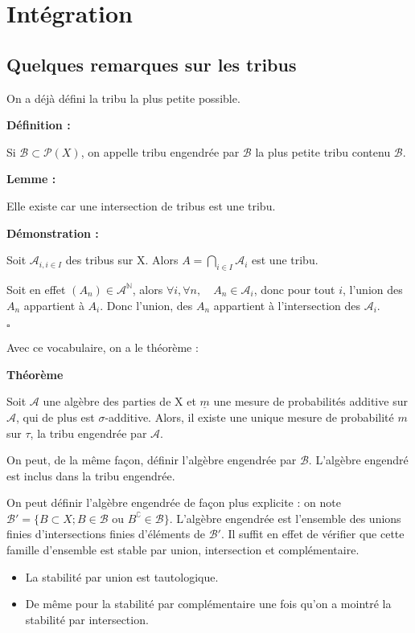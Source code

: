 \documentclass[10pt,a4paper,notitlepage ]{report}
\newcommand{\N}{\mathbb N}
\newcommand{\A}{\mathcal A}
\newcommand{\B}{\mathcal B}
\newcommand{\1}{\mathds 1}
\newcommand{\comp}[1]{#1^\complement}
\newenvironment{definition}[1][]{
	
	\textbf{Définition #1 : }
}
{}
\newcounter{th}
\newenvironment{theorem}[1][]{
\refstepcounter{th}
\begin{tcolorbox}
	\textbf{Théorème \theth \ #1}
	
	
}{\end{tcolorbox}}
\newenvironment{demo}[1][]{

	\textbf{Démonstration #1 :}
}{\begin{flushright}
	$\square$
\end{flushright}
}
\newenvironment{lemme}[1][]{
	\begin{tcolorbox}
		\textbf{Lemme #1 : }
	}
	{\end{tcolorbox}}
\begin{document}
\chapter{Intégration}

\section{Quelques remarques sur les tribus}

On a déjà défini la tribu la plus petite possible. 

\begin{definition}
Si $\mathcal{B} \subset \mathcal{P} (X)$, on appelle tribu engendrée par $\mathcal{B}$ la plus petite tribu contenu $\mathcal{B}$.
\end{definition}

\begin{lemme}
Elle existe car une intersection de tribus est une tribu.
\end{lemme}

\begin{demo}
Soit $\A_{i, i \in I}$ des tribus sur X. Alors $A = \underset{i \in I} \bigcap \A_i $ est une tribu.

Soit en effet $(A_n) \in \A^\N$, alors $\forall i, \forall n, \quad A_n \in \A_i $, donc pour tout $i$, l'union des $A_n$ appartient à $A_i$. Donc l'union, des $A_n$ appartient à l'intersection des $\A_i$.
\end{demo}

Avec ce vocabulaire, on a le théorème :

\begin{theorem}
Soit $\A$ une algèbre des parties de X et $\underline{m}$ une mesure de probabilités additive sur $\A$, qui de plus est $\sigma$-additive. Alors, il existe une unique mesure de probabilité $m$ sur $\tau$, la tribu engendrée par $\A$.
\end{theorem}

On peut, de la même façon, définir l'algèbre engendrée par $\B$.  L'algèbre engendré est inclus dans la tribu engendrée.

On peut définir l'algèbre engendrée de façon plus explicite : on note $\B' = \lbrace B \subset X ; B \in \B \text{ ou } \comp B \in \B \rbrace $. L'algèbre engendrée est l'ensemble des unions finies d'intersections finies d'éléments de $\B'$. Il suffit en effet de vérifier que cette famille d'ensemble est stable par union, intersection et complémentaire. 
\begin{itemize}
	\item La stabilité par union est tautologique.
	\item De même pour la stabilité par complémentaire une fois qu'on a mointré la stabilité par intersection.
\end{itemize}
\end{document}
